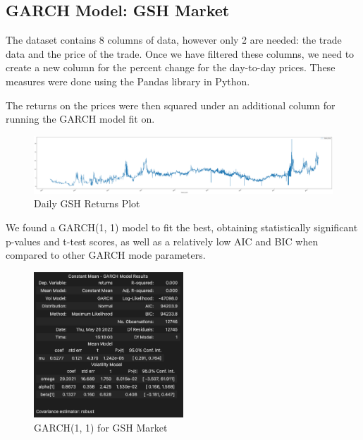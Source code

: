 \subsection{GARCH Model: GSH Market}

The dataset contains 8 columns of data, however only 2 are needed: the trade data and the price of the trade. Once we have filtered these columns, we need to create a new column for the percent change for the day-to-day prices. These measures were done using the Pandas library in Python. 
\medskip

The returns on the prices were then squared under an additional column for running the GARCH model fit on.
\begin{figure}[H]
    \centering
    \includegraphics[width=1.0\textwidth]{Figures/Garch/gas.png}
    \caption{Daily GSH Returns Plot}
    \label{fig:Results_table}
\end{figure}

We found a GARCH(1, 1) model to fit the best, obtaining statistically significant p-values and t-test scores, as well as a relatively low AIC and BIC when compared to other GARCH mode parameters.
\begin{figure}[H]
    \centering
    \includegraphics[width=0.5\textwidth]{Figures/Garch/garch.png}
    \caption{GARCH(1, 1) for GSH Market}
    \label{fig:Results_table}
\end{figure}

